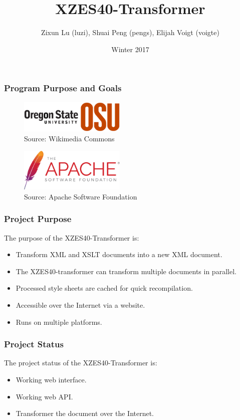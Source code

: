 \documentclass{beamer}
\title{XZES40-Transformer}
\author{Zixun Lu (luzi),
  Shuai Peng (pengs),
  Elijah Voigt (voigte)}
\institute{CS 462 | CS Senior Capstone | Group \#40}
\date{Winter 2017}
\begin{document}
 
\frame{\titlepage}

\begin{frame}
  \frametitle{Program Purpose and Goals }
\begin{figure}
  \centering
    \includegraphics[width=0.45\textwidth]{figures/osu-logo}
    \caption{Source: Wikimedia Commons \cite{osu-logo}}
\end{figure}

\begin{figure}
  \centering
    \includegraphics[width=0.45\textwidth]{figures/asf-logo}
    \caption{Source: Apache Software Foundation \cite{asf-logo}}
\end{figure}
\end{frame}

\begin{frame}
  \frametitle{Project Purpose}
  The purpose of the XZES40-Transformer is:
  \begin{itemize}
  \item Transform XML and XSLT documents into a new XML document.
  \item The XZES40-transformer can transform multiple documents in parallel. 
  \item Processed style sheets are cached for quick recompilation.
  \item Accessible over the Internet via a website.
  \item Runs on multiple platforms.
  \end{itemize}
\end{frame}

\begin{frame}
  \frametitle{Project Status}
  The project status of the XZES40-Transformer is:
  \begin{itemize}
  	\item Working web interface.
  	\item Working web API.
  	\item Transformer the document over the Internet.
  \end{itemize}
\end{frame}
\end{document}
